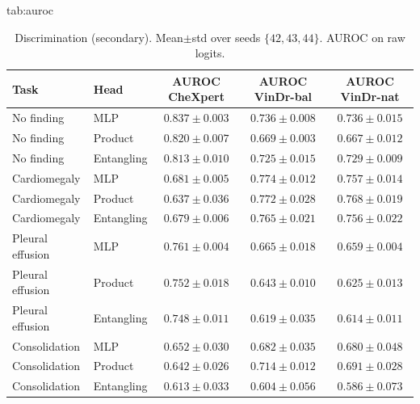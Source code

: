 \documentclass{midl} %
\begin{document}
\begin{table}[ht]
\floatconts
  {tab:auroc}
  {\caption{Discrimination (secondary). Mean$\pm$std over seeds $\{42,43,44\}$. AUROC on raw logits.}}
  {\small\begin{tabular}{llccc}
  \toprule
  Task & Head & AUROC CheXpert & AUROC VinDr-bal & AUROC VinDr-nat \\
  \midrule
  No finding & MLP & $0.837\pm0.003$ & $0.736\pm0.008$ & $0.736\pm0.015$ \\
  No finding & Product & $0.820\pm0.007$ & $0.669\pm0.003$ & $0.667\pm0.012$ \\
  No finding & Entangling & $0.813\pm0.010$ & $0.725\pm0.015$ & $0.729\pm0.009$ \\
  Cardiomegaly & MLP & $0.681\pm0.005$ & $0.774\pm0.012$ & $0.757\pm0.014$ \\
  Cardiomegaly & Product & $0.637\pm0.036$ & $0.772\pm0.028$ & $0.768\pm0.019$ \\
  Cardiomegaly & Entangling & $0.679\pm0.006$ & $0.765\pm0.021$ & $0.756\pm0.022$ \\
  Pleural effusion & MLP & $0.761\pm0.004$ & $0.665\pm0.018$ & $0.659\pm0.004$ \\
  Pleural effusion & Product & $0.752\pm0.018$ & $0.643\pm0.010$ & $0.625\pm0.013$ \\
  Pleural effusion & Entangling & $0.748\pm0.011$ & $0.619\pm0.035$ & $0.614\pm0.011$ \\
  Consolidation & MLP & $0.652\pm0.030$ & $0.682\pm0.035$ & $0.680\pm0.048$ \\
  Consolidation & Product & $0.642\pm0.026$ & $0.714\pm0.012$ & $0.691\pm0.028$ \\
  Consolidation & Entangling & $0.613\pm0.033$ & $0.604\pm0.056$ & $0.586\pm0.073$ \\
  \bottomrule
  \end{tabular}}
\end{table}
\end{document}
